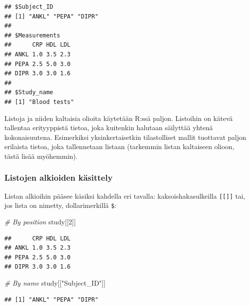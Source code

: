\documentclass[
]{book}
\newenvironment{Shaded}{\begin{snugshade}}{\end{snugshade}}
\newcommand{\CommentTok}[1]{\textcolor[rgb]{0.56,0.35,0.01}{\textit{#1}}}
\newcommand{\DecValTok}[1]{\textcolor[rgb]{0.00,0.00,0.81}{#1}}
\newcommand{\NormalTok}[1]{#1}
\newcommand{\SpecialCharTok}[1]{\textcolor[rgb]{0.00,0.00,0.00}{#1}}
\newcommand{\StringTok}[1]{\textcolor[rgb]{0.31,0.60,0.02}{#1}}
\begin{document}
\begin{verbatim}
## $Subject_ID
## [1] "ANKL" "PEPA" "DIPR"
## 
## $Measurements
##      CRP HDL LDL
## ANKL 1.0 3.5 2.3
## PEPA 2.5 5.0 3.0
## DIPR 3.0 3.0 1.6
## 
## $Study_name
## [1] "Blood tests"
\end{verbatim}

Listoja ja niiden kaltaisia olioita käytetään R:ssä paljon. Listoihin on kätevä tallentaa erityyppistä tietoa, joka kuitenkin halutaan säilyttää yhtenä kokonaisuutena. Esimerkiksi yksinkertaisetkin tilastolliset mallit tuottavat paljon erilaista tietoa, joka tallennetaan listaan (tarkemmin listan kaltaiseen olioon, tästä lisää myöhemmin).

\hypertarget{listojen-alkioiden-kuxe4sittely}{%
\subsubsection{Listojen alkioiden käsittely}\label{listojen-alkioiden-kuxe4sittely}}

Listan alkioihin pääsee käsiksi kahdella eri tavalla: kaksoishakasulkeilla \texttt{{[}{[}{]}{]}} tai, jos lista on nimetty, dollarimerkillä \texttt{\$}:

\begin{Shaded}
\begin{Highlighting}[]
\CommentTok{\# By position}
\NormalTok{study[[}\DecValTok{2}\NormalTok{]]}
\end{Highlighting}
\end{Shaded}

\begin{verbatim}
##      CRP HDL LDL
## ANKL 1.0 3.5 2.3
## PEPA 2.5 5.0 3.0
## DIPR 3.0 3.0 1.6
\end{verbatim}

\begin{Shaded}
\begin{Highlighting}[]
\CommentTok{\# By name}
\NormalTok{study[[}\StringTok{"Subject\_ID"}\NormalTok{]]}
\end{Highlighting}
\end{Shaded}

\begin{verbatim}
## [1] "ANKL" "PEPA" "DIPR"
\end{verbatim}

\begin{Shaded}
\end{Shaded}
\end{document}
